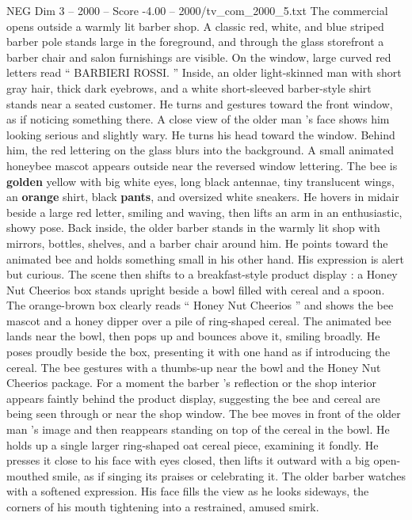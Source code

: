 \begin{textsample}{NEG Dim 3 – 2000 – Score -4.00 – 2000/tv\_com\_2000\_5.txt}  \label{ex:f3_neg_032}
The commercial opens outside a warmly lit barber shop.
A classic red, white, and blue striped barber pole stands large in the foreground, and through the glass storefront a barber chair and salon furnishings are visible.
On the window, large curved red letters read “ BARBIERI ROSSI. ” Inside, an older light-skinned man with short gray hair, thick dark eyebrows, and a white short-sleeved barber-style shirt stands near a seated customer.
He turns and gestures toward the front window, as if noticing something there.
A close view of the older man ’s face shows him looking serious and slightly wary.
He turns his head toward the window.
Behind him, the red lettering on the glass blurs into the background.
A small animated honeybee mascot appears outside near the reversed window lettering.
The bee is \textbf{golden} yellow with big white eyes, long black antennae, tiny translucent wings, an \textbf{orange} shirt, black \textbf{pants}, and oversized white sneakers.
He hovers in midair beside a large red letter, smiling and waving, then lifts an arm in an enthusiastic, showy pose.
Back inside, the older barber stands in the warmly lit shop with mirrors, bottles, shelves, and a barber chair around him.
He points toward the animated bee and holds something small in his other hand.
His expression is alert but curious.
The scene then shifts to a breakfast-style product display : a Honey Nut Cheerios box stands upright beside a bowl filled with cereal and a spoon.
The orange-brown box clearly reads “ Honey Nut Cheerios ” and shows the bee mascot and a honey dipper over a pile of ring-shaped cereal.
The animated bee lands near the bowl, then pops up and bounces above it, smiling broadly.
He poses proudly beside the box, presenting it with one hand as if introducing the cereal.
The bee gestures with a thumbs-up near the bowl and the Honey Nut Cheerios package.
For a moment the barber ’s reflection or the shop interior appears faintly behind the product display, suggesting the bee and cereal are being seen through or near the shop window.
The bee moves in front of the older man ’s image and then reappears standing on top of the cereal in the bowl.
He holds up a single larger ring-shaped oat cereal piece, examining it fondly.
He presses it close to his face with eyes closed, then lifts it outward with a big open-mouthed smile, as if singing its praises or celebrating it.
The older barber watches with a softened expression.
His face fills the view as he looks sideways, the corners of his mouth tightening into a restrained, amused smirk.

\end{textsample}

